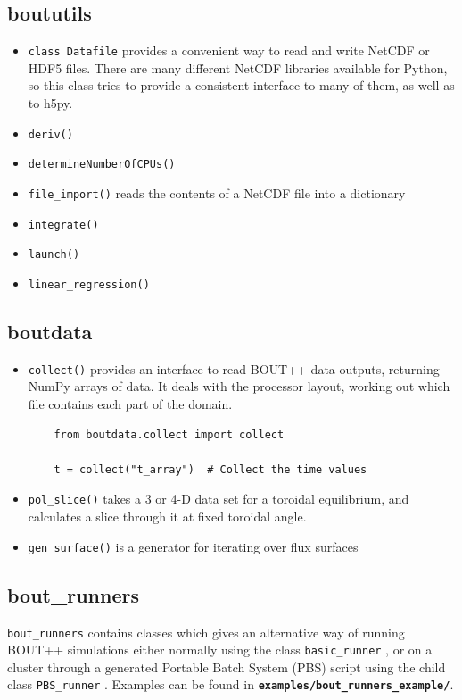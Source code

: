 \documentclass[12pt]{article}
\newcommand{\file}[1]{\texttt{\bf #1}}
\begin{document}
\subsection{boututils}
%
\begin{itemize}
\item
%
\lstinline!class Datafile!
%
 provides a convenient way to read and write NetCDF or HDF5 files. There are
 many different NetCDF libraries available for Python, so this class tries to
 provide a consistent interface to many of them, as well as to h5py.
\item
%
\lstinline!deriv()!
%
\item
%
\lstinline!determineNumberOfCPUs()!
%
\item
%
\lstinline!file_import()!
%
 reads the contents of a NetCDF file into a dictionary
\item
%
\lstinline!integrate()!
%
\item
%
\lstinline!launch()!
%
\item
%
\lstinline!linear_regression()!
%
\end{itemize}
%



\subsection{boutdata}
%
\begin{itemize}
\item
%
\lstinline!collect()!
%
 provides an interface to read BOUT++ data outputs, returning NumPy arrays of data.
  It deals with the processor layout, working out which file contains each part of the domain.
  \begin{lstlisting}
    from boutdata.collect import collect

    t = collect("t_array")  # Collect the time values
  \end{lstlisting}
%
\item
%
\lstinline!pol_slice()!
%
 takes a 3 or 4-D data set for a toroidal equilibrium, and calculates a slice
  through it at fixed toroidal angle.
\item
%
\lstinline!gen_surface()!
%
 is a generator for iterating over flux surfaces
\end{itemize}
%



\subsection{bout\_runners}
%
\label{sec:bout_runners}
%
\lstinline!bout_runners!
%
contains classes which gives an alternative way of running BOUT++ simulations
either normally using the class
%
\lstinline!basic_runner!
%
, or on a cluster through a generated Portable Batch System
(PBS) script using the child class
%
\lstinline!PBS_runner!
%
. Examples can be found in \file{examples/bout\_runners\_example/}.
\end{document}
